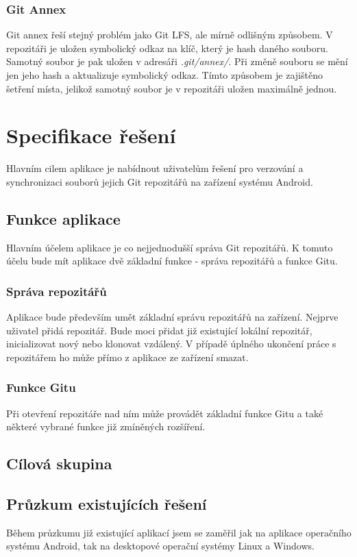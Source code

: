 \subsection{Git Annex}
Git annex řeší stejný problém jako Git LFS, ale mírně odlišným způsobem. V repozitáři je uložen symbolický odkaz na klíč, který je hash daného souboru. Samotný soubor je pak uložen v adresáři \emph{.git/annex/}. Při změně souboru se mění jen jeho hash a aktualizuje symbolický odkaz. Tímto způsobem je zajištěno šetření místa, jelikož samotný soubor je v repozitáři uložen maximálně jednou.


\chapter{Specifikace řešení}
Hlavním cilem aplikace je nabídnout uživatelům řešení pro verzování a synchronizaci souborů jejich Git repozitářů na zařízení systému Android.

\section{Funkce aplikace}
Hlavním účelem aplikace je co nejjednodušší správa Git repozitářů. K tomuto účelu bude mít aplikace dvě základní funkce - správa repozitářů a funkce Gitu.

\subsection{Správa repozitářů}
Aplikace bude především umět základní správu repozitářů na zařízení. Nejprve uživatel přidá repozitář. Bude moci přidat již existující lokální repozitář, inicializovat nový nebo klonovat vzdálený. V případě úplného ukončení práce s repozitářem ho může přímo z aplikace ze zařízení smazat.

\subsection{Funkce Gitu}
Při otevření repozitáře nad ním může provádět základní funkce Gitu a také některé vybrané funkce již zmíněných rozšíření.

\section{Cílová skupina}

\section{Průzkum existujících řešení}
Během průzkumu již existující aplikací jsem se zaměřil jak na aplikace operačního systému Android, tak na desktopové operační systémy Linux a Windows.


